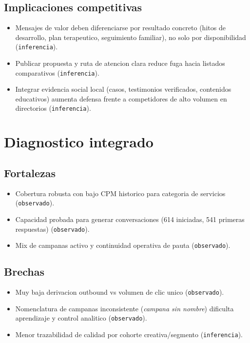 \documentclass[9pt,a4paper,twocolumn,twoside]{tau-class/tau}
\begin{document}
\subsection{Implicaciones competitivas}
\begin{itemize}
  \item Mensajes de valor deben diferenciarse por resultado concreto (hitos de desarrollo, plan terapeutico, seguimiento familiar), no solo por disponibilidad (\texttt{inferencia}).
  \item Publicar propuesta y ruta de atencion clara reduce fuga hacia listados comparativos (\texttt{inferencia}).
  \item Integrar evidencia social local (casos, testimonios verificados, contenidos educativos) aumenta defensa frente a competidores de alto volumen en directorios (\texttt{inferencia}).
\end{itemize}

\section{Diagnostico integrado}

\subsection{Fortalezas}
\begin{itemize}
  \item Cobertura robusta con bajo CPM historico para categoria de servicios (\texttt{observado}).
  \item Capacidad probada para generar conversaciones (614 iniciadas, 541 primeras respuestas) (\texttt{observado}).
  \item Mix de campanas activo y continuidad operativa de pauta (\texttt{observado}).
\end{itemize}

\subsection{Brechas}
\begin{itemize}
  \item Muy baja derivacion outbound vs volumen de clic unico (\texttt{observado}).
  \item Nomenclatura de campanas inconsistente (\textit{campana sin nombre}) dificulta aprendizaje y control analitico (\texttt{observado}).
  \item Menor trazabilidad de calidad por cohorte creativa/segmento (\texttt{inferencia}).
\end{itemize}
\end{document}
